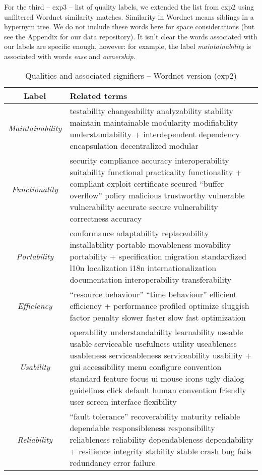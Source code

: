 \documentclass[10pt, conference, compsocconf]{IEEEtran}
\begin{document}
For the third -- \textsf{exp3} -- list of quality labels, we extended the list from \textsf{exp2} using unfiltered Wordnet similarity matches. Similarity in Wordnet means siblings in a hypernym tree. We do not include these words here for space considerations (but see the Appendix for our data repository). It isn't clear the words associated with our labels are specific enough, however: for example, the label \emph{maintainability} is associated with words \emph{ease} and \emph{ownership}.

\begin{table*}[h]
	\caption{Qualities and associated signifiers – Wordnet version (\textsf{exp2})}
	\centering
	\label{tbl:wnsig}
\begin{tabular}{c|p{9cm}}
\toprule
\textbf{Label} & \textbf{Related terms} \\
\midrule
\emph{Maintainability} &
testability changeability analyzability stability maintain maintainable modularity modifiability understandability + interdependent dependency encapsulation decentralized modular\\ \hline
\emph{Functionality} &
security compliance accuracy interoperability suitability functional practicality functionality + compliant exploit certificate secured “buffer overflow” policy malicious trustworthy vulnerable vulnerability accurate secure vulnerability correctness accuracy\\ \hline
\emph{Portability} &
conformance adaptability replaceability installability portable movableness movability portability + specification migration standardized l10n localization i18n internationalization documentation interoperability transferability\\ \hline
\emph{Efficiency} &
“resource behaviour” “time behaviour” efficient efficiency + performance profiled optimize sluggish factor penalty slower faster slow fast optimization\\ \hline
\emph{Usability} &
operability understandability learnability useable usable serviceable usefulness utility useableness usableness serviceableness serviceability usability + gui accessibility menu configure convention standard feature focus ui mouse icons ugly dialog guidelines click default human convention friendly user screen interface flexibility\\ \hline
\emph{Reliability} &
“fault tolerance” recoverability maturity reliable dependable responsibleness responsibility reliableness reliability dependableness dependability + resilience integrity stability stable crash bug fails redundancy error failure\\ 
\bottomrule
\end{tabular}
\end{table*}
\end{document}
